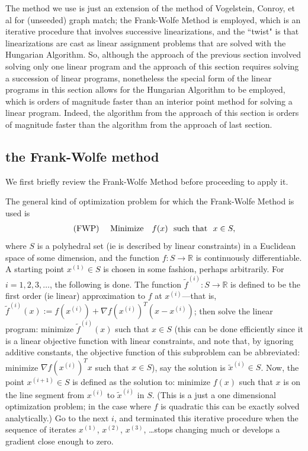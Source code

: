 \documentclass[12pt]{article}
\newcommand{\R}{\mathbb{R}}
\begin{document}
 The method we use is just an extension of the method
 of Vogelstein, Conroy, et al  for (unseeded) graph match; the
 Frank-Wolfe Method is employed, which is an iterative procedure that
involves successive linearizations, and the ``twist" is that
linearizations are cast as linear assignment problems that are solved with
the Hungarian Algorithm. So, although the approach of the previous section involved
solving only one linear program and the approach of 
this section requires solving a succession of
linear programs, nonetheless the special form of the linear programs in this
section allows for the Hungarian Algorithm to be employed, which is orders
of magnitude faster than  an interior point method for solving a linear program.
Indeed, the algorithm from the approach of this section is orders of
magnitude faster than the algorithm from the approach of last section.

\subsection{the Frank-Wolfe method}

We first briefly review the Frank-Wolfe Method before proceeding
to apply it.

The general kind of
 optimization problem for which the Frank-Wolfe Method is used is
  \begin{eqnarray} \label{i} \textup{(FWP)  \ \ \ Minimize}
\ \ \  f(x) \ \textup{   such that   } \
x \in S,
\end{eqnarray}
where $S$ is a polyhedral set (ie is described by linear
constraints) in a Euclidean space of some dimension,
and the function $f:S \rightarrow \R$ is continuously differentiable.
A starting point $x^{(1)} \in S$ is chosen in some fashion,
perhaps arbitrarily. For $i=1,2,3,\ldots$, the following is done.
The function $\tilde{f}^{(i)}:S \rightarrow \R$ is defined to be the
first order (ie linear) approximation to $f$ at $x^{(i)}$---that is,
$\tilde{f}^{(i)}(x):=f(x^{(i)})+\nabla f(x^{(i)})^T(x-x^{(i)})$;
then solve the linear program: minimize $\tilde{f}^{(i)}(x)$ such that $x \in S$
(this can be done efficiently since it is a linear
objective function with linear constraints, and note that, by ignoring additive constants, the objective function of this subproblem can be
abbreviated: minimize $\nabla f(x^{(i)})^Tx$
such that $x \in S$), say the solution is
$\tilde{x}^{(i)} \in S$. Now, the point $x^{(i+1)} \in S$ is defined
as the solution to: minimize $f(x)$ such that $x$ is on the line segment
from $x^{(i)}$ to $\tilde{x}^{(i)}$ in $S$. (This is a just a one dimensional
optimization problem; in the case where $f$ is quadratic this can
be exactly solved analytically.) Go to the next $i$,
and terminated this iterative procedure
when the sequence of iterates $x^{(1)}$, $x^{(2)}$, $x^{(3)}$, \ldots stops
changing much or develops a gradient close enough to zero.
\end{document}
